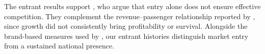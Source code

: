 The entrant results support \textcite{oliveira2018effective}, who argue that entry alone does not ensure effective competition. They complement the revenue--passenger relationship reported by \textcite{jayathilakan2024determinants}, since growth did not consistently bring profitability or survival. Alongside the brand-based measures used by \textcite{kumari2026soaring}, our entrant histories distinguish market entry from a sustained national presence.
